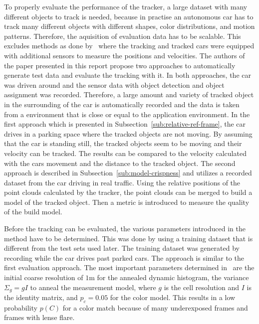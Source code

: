 \documentclass[twoside,a4paper,article]{combine}
\begin{document}
To properly evaluate the performance of the tracker, a large dataset
with many different objects to track is needed, because in practise an
autonomous car has to track many different objects with different
shapes, color distributions, and motion patterns. Therefore, the
aquisition of evaluation data has to be scalable. This excludes
methods as done by~\cite{unscalable-eval} where the tracking and
tracked cars were equipped with additional sensors to measure the
positions and velocities. The authors of the paper presented in this
report propose two approaches to automatically generate test data and
evaluate the tracking with it. In both approaches, the car was driven
around and the sensor data with object detection and object assignment
was recorded. Therefore, a large amount and variety of tracked object
in the surrounding of the car is automatically recorded and the data
is taken from a environment that is close or equal to the application
environment. In the first approach which is presented in
Subsection~\ref{sub:relative-ref-frame}, the car drives in a
parking space where the tracked objects are not moving. By assuming
that the car is standing still, the tracked objects seem to be
moving and their  velocity can be tracked. The results can
be compared to the velocity calculated with the cars movement and the
distance to the tracked object. The second approach is described in
Subsection~\ref{sub:model-crispness} and utilizes a recorded dataset
from the car driving in real traffic. Using the relative positions of
the point clouds calculated by the tracker, the point clouds can be
merged to build a model of the tracked object. Then a metric is
introduced to measure the quality of the build model.

Before the tracking can be evaluated, the various parameters
introduced in the method have to be determined. This was done by using
a training dataset that is different from the test sets used
later. The training dataset was generated by recording while the car
drives past parked cars. The approach is similar to the first
evaluation approach. The most important parameters determined
in~\cite{paper} are the initial coarse resolution of $1$m for the
annealed dynamic histogram, the variance $\Sigma_g=gI$ to anneal the
measurement model, where $g$ is the cell resolution and $I$ is the
identity matrix, and $p_c=0.05$ for the color model. This results in a
low probability $p(C)$ for a color match because of many underexposed
frames and frames with lense flare.
\end{document}
